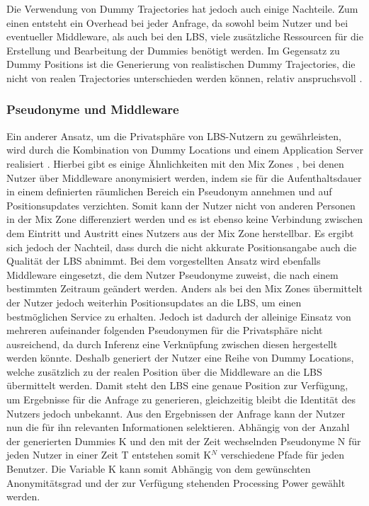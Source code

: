 Die Verwendung von Dummy Trajectories hat jedoch auch einige Nachteile. Zum einen entsteht ein Overhead bei jeder Anfrage, da sowohl beim Nutzer und bei eventueller Middleware, als auch bei den LBS, viele zusätzliche Ressourcen für die Erstellung und Bearbeitung der Dummies benötigt werden. Im Gegensatz zu Dummy Positions ist die Generierung von realistischen Dummy Trajectories, die nicht von realen Trajectories unterschieden werden können, relativ anspruchsvoll \cite{Beresford2003}.


\subsubsection{Pseudonyme und Middleware} \label{subsubsection:pseudomiddle}
Ein anderer Ansatz, um die Privatsphäre von LBS-Nutzern zu gewährleisten, wird durch die Kombination von Dummy Locations und einem Application Server realisiert \cite{Sahu2012}. Hierbei gibt es einige Ähnlichkeiten mit den Mix Zones \cite{Beresford2003}, bei denen Nutzer über Middleware anonymisiert werden, indem sie für die Aufenthaltsdauer in einem definierten räumlichen Bereich ein Pseudonym annehmen und auf Positionsupdates verzichten. Somit kann der Nutzer nicht von anderen Personen in der Mix Zone differenziert werden und es ist ebenso keine Verbindung zwischen dem Eintritt und Austritt eines Nutzers aus der Mix Zone herstellbar. Es ergibt sich jedoch der Nachteil, dass durch die nicht akkurate Positionsangabe auch die Qualität der LBS abnimmt. 
Bei dem vorgestellten Ansatz wird ebenfalls Middleware eingesetzt, die dem Nutzer Pseudonyme zuweist, die nach einem bestimmten Zeitraum geändert werden. Anders als bei den Mix Zones übermittelt der Nutzer jedoch weiterhin Positionsupdates an die LBS, um einen bestmöglichen Service zu erhalten. Jedoch ist dadurch der alleinige Einsatz von mehreren aufeinander folgenden Pseudonymen für die Privatsphäre nicht ausreichend, da durch Inferenz eine Verknüpfung zwischen diesen hergestellt werden könnte. Deshalb generiert der Nutzer eine Reihe von Dummy Locations, welche zusätzlich zu der realen Position über die Middleware an die LBS übermittelt werden. Damit steht den LBS eine genaue Position zur Verfügung, um Ergebnisse für die Anfrage zu generieren, gleichzeitig bleibt die Identität des Nutzers jedoch unbekannt. Aus den Ergebnissen der Anfrage kann der Nutzer nun die für ihn relevanten Informationen selektieren.
Abhängig von der Anzahl der generierten Dummies K und den mit der Zeit wechselnden Pseudonyme N für jeden Nutzer in einer Zeit T entstehen somit K$^{N}$ verschiedene Pfade für jeden Benutzer. Die Variable K kann somit Abhängig von dem gewünschten Anonymitätsgrad und der zur Verfügung stehenden Processing Power gewählt werden.
